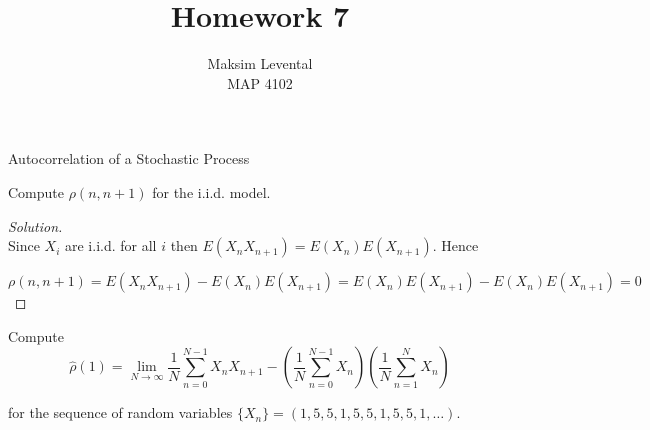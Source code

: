 \documentclass[12pt]{article}
\newenvironment{problem}[2][Problem]{\begin{trivlist}
\item[\hskip \labelsep {\bfseries #1}\hskip \labelsep {\bfseries #2.}]}{\end{trivlist}}
\newenvironment{solution}
  {\begin{proof}[Solution]\renewcommand{\qedsymbol}{}}
  {\end{proof}}
\begin{document}
 
 
\title{Homework 7}%
\author{Maksim Levental\\ %
MAP 4102} %
 
\maketitle
 
\begin{bf}Autocorrelation of a Stochastic Process \end{bf}

\begin{problem}{1} %
Compute $\rho(n,n+1)$ for the i.i.d. model.
\end{problem}
 
\begin{solution}\ \\

Since $X_i$ are i.i.d. for all $i$ then $E(X_n X_{n+1}) = E(X_n) E(X_{n+1})$. Hence 

$$
\rho(n,n+1) = E(X_n X_{n+1}) - E(X_n) E(X_{n+1}) = E(X_n) E(X_{n+1}) - E(X_n) E(X_{n+1}) = 0
$$

\end{solution}
\begin{problem}{2} %
Compute 
$$
\hat \rho(1) = \lim_{N \to \infty} \frac{1}{N} \sum_{n=0}^{N-1} X_n X_{n+1} - \left(\frac{1}{N} \sum_{n=0}^{N-1} X_n\right) \left(\frac{1}{N} \sum_{n=1}^N X_n \right) 
$$

\noindent for the sequence of random variables $\{X_n\} = (1,5,5,1,5,5,1,5,5,1, \ldots)$.
\end{problem}
 
\end{document}
